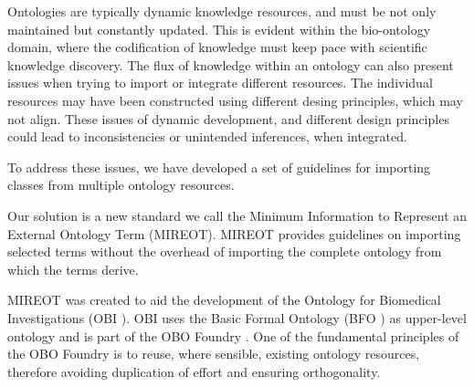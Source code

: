 \documentclass{elsart3p}    %
\newcommand{\protege}{Prot\'{e}g\'{e}}
\begin{document}


Ontologies are typically dynamic knowledge resources, and must be not only maintained but constantly updated.
This is evident within the bio-ontology domain, where the codification of knowledge must keep pace with scientific knowledge discovery.
The flux of knowledge within an ontology can also present issues when trying to import or integrate different resources.
The individual resources may have been constructed using different desing principles, which may not align.
These issues of dynamic development, and different design principles could lead to inconsistencies or unintended inferences, when integrated.


To address these issues, we have developed a set of guidelines for importing classes from multiple ontology resources.


Our solution is a new standard we call the Minimum Information to Represent an External Ontology Term (MIREOT).
MIREOT provides guidelines on importing selected terms without the overhead of importing the complete ontology from which the terms derive. 

MIREOT was created to aid the development of the Ontology for Biomedical Investigations (OBI  \cite{RefWorks:1507}).
OBI uses the Basic Formal Ontology (BFO \cite{RefWorks:1557}) as upper-level ontology and is part of the OBO Foundry \cite{RefWorks:1472}. 
One of the fundamental principles of the OBO Foundry is to reuse, where sensible, existing ontology resources, therefore avoiding duplication of effort and ensuring orthogonality.
\end{document}
